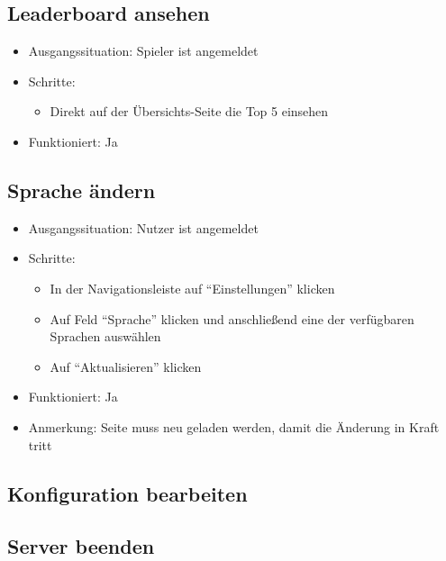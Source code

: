 \documentclass[a4paper]{scrreprt}
\begin{document}
            \subsection{Leaderboard ansehen}
            \begin{itemize}
                \item Ausgangssituation: Spieler ist angemeldet
                \item Schritte:
                    \begin{itemize}
                        \item Direkt auf der Übersichts-Seite die Top 5 einsehen
                    \end{itemize}
                \item Funktioniert: Ja
            \end{itemize}

            \subsection{Sprache ändern}
            \begin{itemize}
                \item Ausgangssituation: Nutzer ist angemeldet
                \item Schritte:
                    \begin{itemize}
                        \item In der Navigationsleiste auf \enquote{Einstellungen} klicken
                        \item Auf Feld \enquote{Sprache} klicken und anschließend eine der verfügbaren Sprachen auswählen
                        \item Auf \enquote{Aktualisieren} klicken
                    \end{itemize}
                \item Funktioniert: Ja
                \item Anmerkung: Seite muss neu geladen werden, damit die Änderung in Kraft tritt
            \end{itemize}

            \subsection{Konfiguration bearbeiten}


            \subsection{Server beenden}
\end{document}
